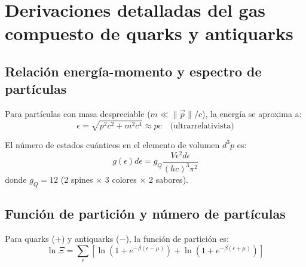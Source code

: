 





\section{Derivaciones detalladas del gas compuesto de quarks y antiquarks}
\subsection{Relación energía-momento y espectro de partículas}
Para partículas con masa despreciable ($m \ll \|\overrightarrow{p}\|/c$), la energía se aproxima a:
\begin{equation}
\epsilon = \sqrt{p^2c^2 + m^2c^4} \approx pc \quad \text{(ultrarrelativista)}
\end{equation}

El número de estados cuánticos en el elemento de volumen $d^3p$ es:
\begin{equation}
g(\epsilon) d\epsilon = g_Q \frac{V \epsilon^2 d\epsilon}{(hc)^3 \pi^2}
\end{equation}
donde $g_Q = 12$ (2 spines $\times$ 3 colores $\times$ 2 sabores).

\subsection{Función de partición y número de partículas}
Para quarks ($+$) y antiquarks ($-$), la función de partición es:
\begin{equation}
\ln \Xi = \sum_{\epsilon} \left[ \ln\left(1 + e^{-\beta(\epsilon-\mu)}\right) + \ln\left(1 + e^{-\beta(\epsilon+\mu)}\right) \right]
\end{equation}

